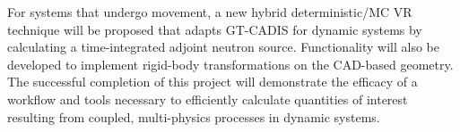 For systems that undergo movement,
 a new hybrid 
deterministic/MC VR technique will be proposed that adapts 
GT-CADIS for dynamic systems by calculating a time-integrated adjoint
neutron source.
Functionality will also be developed 
to implement rigid-body transformations on the CAD-based geometry.
The successful completion of this project will demonstrate the efficacy of a workflow and tools
necessary to efficiently calculate quantities of interest resulting from
coupled, multi-physics processes in dynamic systems.  

